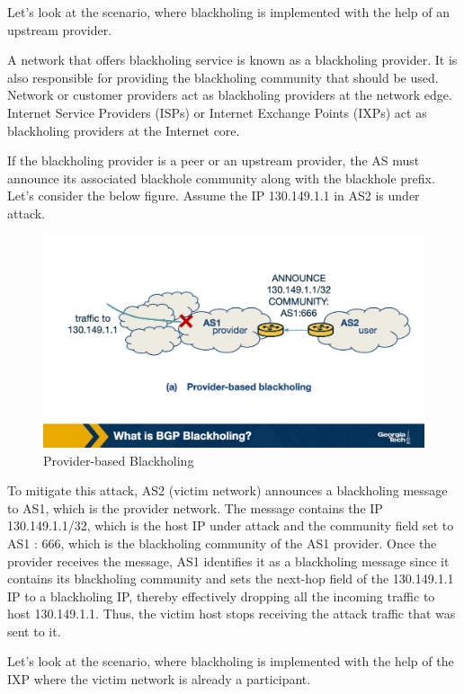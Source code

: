 \documentclass[11pt]{article}
\begin{document}
Let's look at the scenario, where blackholing is implemented with the help of an upstream provider.

A network that offers blackholing service is known as a blackholing provider. It is also responsible for providing the blackholing community that should be used. Network or customer providers act as blackholing providers at the network edge. Internet Service Providers (ISPs) or Internet Exchange Points (IXPs) act as blackholing providers at the Internet core. 

If the blackholing provider is a peer or an upstream provider, the AS must announce its associated blackhole community along with the blackhole prefix. Let’s consider the below figure. Assume the IP 130.149.1.1 in AS2 is under attack.

\begin{figure}[htbp]
\centering
\includegraphics[width=.9\linewidth]{./MD_Figures/9_bgp_blackholing_1.png}
\caption{\label{fig:orge53aa62}Provider-based Blackholing}
\end{figure}

To mitigate this attack, AS2 (victim network) announces a blackholing message to AS1, which is the provider network. The message contains the IP 130.149.1.1/32, which is the host IP under attack and the community field set to AS1 : 666, which is the blackholing community of the AS1 provider. Once the provider receives the message, AS1 identifies it as a blackholing message since it contains its blackholing community and sets the next-hop field of the 130.149.1.1 IP to a blackholing IP, thereby effectively dropping all the incoming traffic to host 130.149.1.1. Thus, the victim host stops receiving the attack traffic that was sent to it. 

Let's look at the scenario, where blackholing is implemented with the help of the IXP where the victim network is already a participant.
\end{document}
